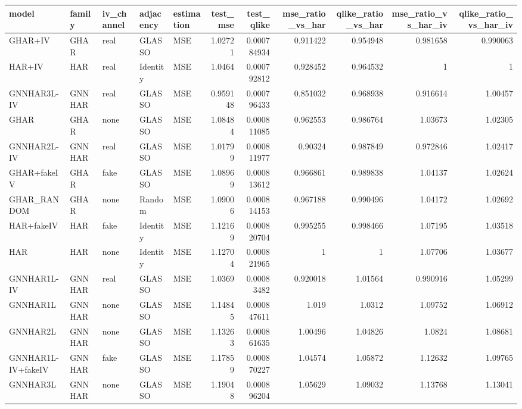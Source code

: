 \begin{tabular}{lllllrrrrrr}
\toprule
model & family & iv_channel & adjacency & estimation & test_mse & test_qlike & mse_ratio_vs_har & qlike_ratio_vs_har & mse_ratio_vs_har_iv & qlike_ratio_vs_har_iv \\
\midrule
GHAR+IV & GHAR & real & GLASSO & MSE & 1.02721 & 0.000784934 & 0.911422 & 0.954948 & 0.981658 & 0.990063 \\
HAR+IV & HAR & real & Identity & MSE & 1.0464 & 0.000792812 & 0.928452 & 0.964532 & 1 & 1 \\
GNNHAR3L-IV & GNNHAR & real & GLASSO & MSE & 0.959148 & 0.000796433 & 0.851032 & 0.968938 & 0.916614 & 1.00457 \\
GHAR & GHAR & none & GLASSO & MSE & 1.08484 & 0.000811085 & 0.962553 & 0.986764 & 1.03673 & 1.02305 \\
GNNHAR2L-IV & GNNHAR & real & GLASSO & MSE & 1.01799 & 0.000811977 & 0.90324 & 0.987849 & 0.972846 & 1.02417 \\
GHAR+fakeIV & GHAR & fake & GLASSO & MSE & 1.08969 & 0.000813612 & 0.966861 & 0.989838 & 1.04137 & 1.02624 \\
GHAR_RANDOM & GHAR & none & Random & MSE & 1.09006 & 0.000814153 & 0.967188 & 0.990496 & 1.04172 & 1.02692 \\
HAR+fakeIV & HAR & fake & Identity & MSE & 1.12169 & 0.000820704 & 0.995255 & 0.998466 & 1.07195 & 1.03518 \\
HAR & HAR & none & Identity & MSE & 1.12704 & 0.000821965 & 1 & 1 & 1.07706 & 1.03677 \\
GNNHAR1L-IV & GNNHAR & real & GLASSO & MSE & 1.0369 & 0.00083482 & 0.920018 & 1.01564 & 0.990916 & 1.05299 \\
GNNHAR1L & GNNHAR & none & GLASSO & MSE & 1.14845 & 0.000847611 & 1.019 & 1.0312 & 1.09752 & 1.06912 \\
GNNHAR2L & GNNHAR & none & GLASSO & MSE & 1.13263 & 0.000861635 & 1.00496 & 1.04826 & 1.0824 & 1.08681 \\
GNNHAR1L-IV+fakeIV & GNNHAR & fake & GLASSO & MSE & 1.17859 & 0.000870227 & 1.04574 & 1.05872 & 1.12632 & 1.09765 \\
GNNHAR3L & GNNHAR & none & GLASSO & MSE & 1.19048 & 0.000896204 & 1.05629 & 1.09032 & 1.13768 & 1.13041 \\
\bottomrule
\end{tabular}
